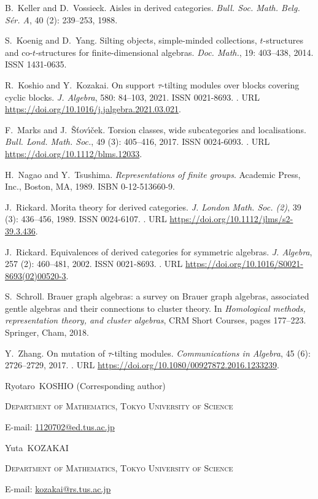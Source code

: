 \documentclass[pdftex,a4paper]{article}
\makeatletter
\numberwithin{equation}{subsection}
\theoremstyle{definition}
\newcommand{\Addresses}{{
  \bigskip
  \footnotesize

  Ryotaro~KOSHIO (Corresponding author)\par\nopagebreak
  \textsc{Department of Mathematics, Tokyo University of Science}
  \par\nopagebreak
  E-mail: \href{mailto:1120702@ed.tus.ac.jp}{1120702@ed.tus.ac.jp}

  \medskip

  Yuta~KOZAKAI
  \par\nopagebreak
  \textsc{Department of Mathematics, Tokyo University of Science}\par\nopagebreak
  E-mail: \href{mailto:kozakai@rs.tus.ac.jp}{kozakai@rs.tus.ac.jp}
}}
\makeatother
\begin{document}
\begin{thebibliography}{23}
	B.~Keller and D.~Vossieck.
	\newblock Aisles in derived categories.
	\newblock \emph{Bull. Soc. Math. Belg. S{\'e}r. A}, 40 (2):
	239--253, 1988.

	S.~Koenig and D.~Yang.
	\newblock Silting objects, simple-minded collections, {$t$}-structures and
	co-{$t$}-structures for finite-dimensional algebras.
	\newblock \emph{Doc. Math.}, 19: 403--438, 2014.
	\newblock ISSN 1431-0635.

	R.~Koshio and Y.~Kozakai.
	\newblock On support {$\tau$}-tilting modules over blocks covering cyclic
	blocks.
	\newblock \emph{J. Algebra}, 580: 84--103, 2021.
	\newblock ISSN 0021-8693.
	\newblock {}.
	\newblock URL \url{https://doi.org/10.1016/j.jalgebra.2021.03.021}.

	F.~Marks and J.~\v{S}\v{t}ov\'{\i}\v{c}ek.
	\newblock Torsion classes, wide subcategories and localisations.
	\newblock \emph{Bull. Lond. Math. Soc.}, 49 (3): 405--416,
	2017.
	\newblock ISSN 0024-6093.
	\newblock {}.
	\newblock URL \url{https://doi.org/10.1112/blms.12033}.

	H.~Nagao and Y.~Tsushima.
	\newblock \emph{Representations of finite groups}.
	\newblock Academic Press, Inc., Boston, MA, 1989.
	\newblock ISBN 0-12-513660-9.

	J.~Rickard.
	\newblock Morita theory for derived categories.
	\newblock \emph{J. London Math. Soc. (2)}, 39 (3): 436--456,
	1989.
	\newblock ISSN 0024-6107.
	\newblock {}.
	\newblock URL \url{https://doi.org/10.1112/jlms/s2-39.3.436}.

	J.~Rickard.
	\newblock Equivalences of derived categories for symmetric algebras.
	\newblock \emph{J. Algebra}, 257 (2): 460--481, 2002.
	\newblock ISSN 0021-8693.
	\newblock {}.
	\newblock URL \url{https://doi.org/10.1016/S0021-8693(02)00520-3}.

	S.~Schroll.
	\newblock Brauer graph algebras: a survey on {B}rauer graph algebras,
	associated gentle algebras and their connections to cluster theory.
	\newblock In \emph{Homological methods, representation theory, and cluster
		algebras}, CRM Short Courses, pages 177--223. Springer, Cham, 2018.

	Y.~Zhang.
	\newblock On mutation of {$\tau$}-tilting modules.
	\newblock \emph{Communications in Algebra}, 45 (6):
	2726--2729, 2017.
	\newblock {}.
	\newblock URL \url{https://doi.org/10.1080/00927872.2016.1233239}.

\end{thebibliography}

\Addresses
\end{document}

